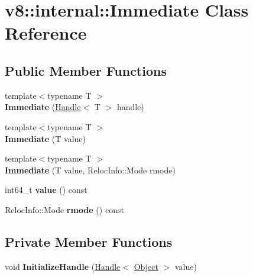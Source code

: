 \hypertarget{classv8_1_1internal_1_1_immediate}{}\section{v8\+:\+:internal\+:\+:Immediate Class Reference}
\label{classv8_1_1internal_1_1_immediate}
\subsection*{Public Member Functions}
\begin{DoxyCompactItemize}
\item 
{\footnotesize template$<$typename T $>$ }\\{\bfseries Immediate} (\hyperlink{classv8_1_1internal_1_1_handle}{Handle}$<$ T $>$ handle)\hypertarget{classv8_1_1internal_1_1_immediate_a4e8bee398b88c314599c0dd63b5c063b}{}\label{classv8_1_1internal_1_1_immediate_a4e8bee398b88c314599c0dd63b5c063b}

\item 
{\footnotesize template$<$typename T $>$ }\\{\bfseries Immediate} (T value)\hypertarget{classv8_1_1internal_1_1_immediate_aa020cdd47a96749e2a70eb9a64440bd6}{}\label{classv8_1_1internal_1_1_immediate_aa020cdd47a96749e2a70eb9a64440bd6}

\item 
{\footnotesize template$<$typename T $>$ }\\{\bfseries Immediate} (T value, Reloc\+Info\+::\+Mode rmode)\hypertarget{classv8_1_1internal_1_1_immediate_a1930cc50e6a8c6499c00ba08a8ccfa9b}{}\label{classv8_1_1internal_1_1_immediate_a1930cc50e6a8c6499c00ba08a8ccfa9b}

\item 
int64\+\_\+t {\bfseries value} () const \hypertarget{classv8_1_1internal_1_1_immediate_a81b01d34687d5df95a48b1c00517f852}{}\label{classv8_1_1internal_1_1_immediate_a81b01d34687d5df95a48b1c00517f852}

\item 
Reloc\+Info\+::\+Mode {\bfseries rmode} () const \hypertarget{classv8_1_1internal_1_1_immediate_a75fc95e4883d8cf1c7478e57981b51ac}{}\label{classv8_1_1internal_1_1_immediate_a75fc95e4883d8cf1c7478e57981b51ac}

\end{DoxyCompactItemize}
\subsection*{Private Member Functions}
\begin{DoxyCompactItemize}
\item 
void {\bfseries Initialize\+Handle} (\hyperlink{classv8_1_1internal_1_1_handle}{Handle}$<$ \hyperlink{classv8_1_1internal_1_1_object}{Object} $>$ value)\hypertarget{classv8_1_1internal_1_1_immediate_a6acb57a4adc342ecb89e6a50731e4d33}{}\label{classv8_1_1internal_1_1_immediate_a6acb57a4adc342ecb89e6a50731e4d33}

\end{DoxyCompactItemize}
